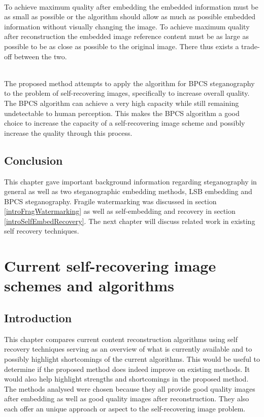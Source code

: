 \documentclass[12pt]{article}
\begin{document}
\hspace{0pt} \\
To achieve maximum quality after embedding the embedded information must be as small as possible or the algorithm should allow as much as possible embedded information without visually changing the image.
To achieve maximum quality after reconstruction the embedded image reference content must be as large as possible to be as close as possible to the original image.
There thus exists a trade-off between the two.

\hspace{0pt} \\
The proposed method attempts to apply the algorithm for BPCS steganography
to the problem of self-recovering images, specifically to increase overall quality.
The BPCS algorithm can achieve a very high capacity while still remaining undetectable to human perception.
This makes the BPCS algorithm a good choice to increase the capacity of a self-recovering image scheme and possibly increase the quality through this process.

\subsection{Conclusion}
\label{introConclusion}
This chapter gave important background information regarding steganography in general as well as two steganographic embedding methods, LSB embedding and BPCS steganography.
Fragile watermarking was discussed in section \ref{introFragWatermarking} as well as self-embedding and recovery in section \ref{introSelfEmbedRecovery}.
The next chapter will discuss related work in existing self recovery techniques.

\section{Current self-recovering image schemes and algorithms}
\label{currentSelfRecoveringSchemes}
\subsection{Introduction}
This chapter compares current content reconstruction algorithms using self recovery techniques serving as an overview of what is currently available and to possibly highlight shortcomings of the current algorithms.
This would be useful to determine if the proposed method does indeed improve on existing methods. 
It would also help highlight strengths and shortcomings in the proposed method.
The methods analysed were chosen because they all provide good quality images after embedding as well as good quality images after reconstruction.
They also each offer an unique approach or aspect to the self-recovering image problem.
\end{document}
